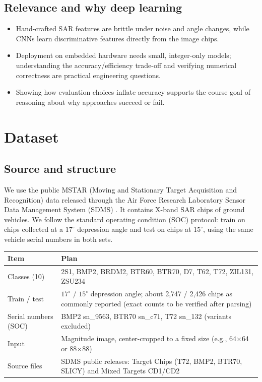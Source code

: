 \documentclass[10pt,letterpaper]{article}
\begin{document}
\subsection{Relevance and why deep learning}
\begin{itemize}
\item Hand-crafted SAR features are brittle under noise and angle changes, while CNNs learn discriminative features directly from the image chips.
\item Deployment on embedded hardware needs small, integer-only models; understanding the accuracy/efficiency trade-off and verifying numerical correctness are practical engineering questions.
\item Showing how evaluation choices inflate accuracy supports the course goal of reasoning about why approaches succeed or fail.
\end{itemize}

\section{Dataset}
\subsection{Source and structure}
We use the public MSTAR (Moving and Stationary Target Acquisition and Recognition) data released through the Air Force Research Laboratory Sensor Data Management System (SDMS) \cite{sdms}. It contains X-band SAR chips of ground vehicles. We follow the standard operating condition (SOC) protocol: train on chips collected at a $17^\circ$ depression angle and test on chips at $15^\circ$, using the same vehicle serial numbers in both sets.

\begin{center}
\small
\begin{tabularx}{\linewidth}{@{}l X@{}}
\toprule
Item & Plan \\
\midrule
Classes (10) & 2S1, BMP2, BRDM2, BTR60, BTR70, D7, T62, T72, ZIL131, ZSU234 \\
Train / test & $17^\circ$ / $15^\circ$ depression angle; about 2,747 / 2,426 chips as commonly reported (exact counts to be verified after parsing) \\
Serial numbers (SOC) & BMP2 sn\_9563, BTR70 sn\_c71, T72 sn\_132 (variants excluded) \\
Input & Magnitude image, center-cropped to a fixed size (e.g., 64$\times$64 or 88$\times$88) \\
Source files & SDMS public releases: Target Chips (T72, BMP2, BTR70, SLICY) and Mixed Targets CD1/CD2 \\
\bottomrule
\end{tabularx}
\end{center}
\end{document}
